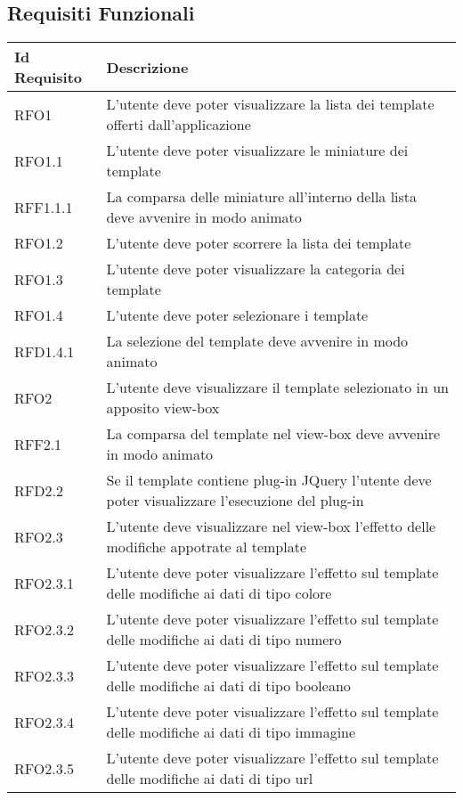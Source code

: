 \subsection{Requisiti Funzionali} \label{subsec: requisitiF}
\normalsize
\begin{longtable}{|l|m{11cm}|}
\hline
\textbf{Id Requisito} & \textbf{Descrizione}\\
\hline
\endhead
RFO1 & L'utente deve poter visualizzare la lista dei template offerti dall'applicazione \\ \hline
RFO1.1 & L'utente deve poter visualizzare le miniature dei template \\ \hline
RFF1.1.1 & La comparsa delle miniature all'interno della lista deve avvenire in modo animato \\ \hline
RFO1.2 & L'utente deve poter scorrere la lista dei template \\ \hline
RFO1.3 & L'utente deve poter visualizzare la categoria dei template \\ \hline
RFO1.4 & L'utente deve poter selezionare i template \\ \hline
RFD1.4.1 & La selezione del template deve avvenire in modo animato \\ \hline
RFO2 & L'utente deve visualizzare il template selezionato in un apposito view-box \\ \hline
RFF2.1 & La comparsa del template nel view-box deve avvenire in modo animato \\ \hline
RFD2.2 & Se il template contiene plug-in JQuery l'utente deve poter visualizzare l'esecuzione del plug-in \\ \hline
RFO2.3 & L'utente deve visualizzare nel view-box l'effetto delle modifiche appotrate al template \\ \hline
RFO2.3.1 & L'utente deve poter visualizzare l'effetto sul template delle modifiche ai dati di tipo colore \\ \hline
RFO2.3.2 & L'utente deve poter visualizzare l'effetto sul template delle modifiche ai dati di tipo numero \\ \hline
RFO2.3.3 & L'utente deve poter visualizzare l'effetto sul template delle modifiche ai dati di tipo booleano \\ \hline
RFO2.3.4 & L'utente deve poter visualizzare l'effetto sul template delle modifiche ai dati di tipo immagine \\ \hline
RFO2.3.5 & L'utente deve poter visualizzare l'effetto sul template delle modifiche ai dati di tipo url \\ \hline

\end{longtable}
